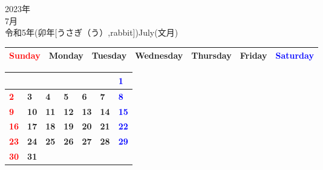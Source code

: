 \documentclass[a4paper,landscape]{jsarticle}
\newcommand{\dig}{\hspace{29mm}}
\newcommand{\tdig}{\hspace{27mm}}
\newcommand{\LBF}{\LARGE\textbf}
\begin{document}
\newpage

\begin{center}
	\HUGE 2023年\\
	\huge 7月\\
	\large 令和5年(卯年[うさぎ（う）,rabbit])July(文月)
\end{center}

\begingroup
\renewcommand{\arraystretch}{1.4}
\begin{tabular}{|>{\centering\arraybackslash}p{32mm}|>{\centering\arraybackslash}p{32mm}|>{\centering\arraybackslash}p{32mm}|>{\centering\arraybackslash}p{32mm}|>{\centering\arraybackslash}p{32mm}|>{\centering\arraybackslash}p{32mm}|>{\centering\arraybackslash}p{32mm}|}
\hline
\textcolor{red}{\large Sunday}&\large Monday&\large Tuesday&\large Wednesday&\large Thursday&\large Friday&\textcolor{blue}{\large Saturday}\\
\hline
\end{tabular}
\endgroup

\begingroup
\renewcommand{\arraystretch}{4}
\begin{tabular}{|p{32mm}|p{32mm}|p{32mm}|p{32mm}|p{32mm}|p{32mm}|p{32mm}|}
\hline
&&&&&&\raisebox{30pt} {\dig\textcolor{blue}{\LBF{1}}}\\
\hline
\raisebox{30pt} {\dig\textcolor{red}{\LBF{2}}}&\raisebox{30pt} {\dig\LBF{3}}&\raisebox{30pt} {\dig\LBF{4}}&\raisebox{30pt} {\dig\LBF{5}}&\raisebox{30pt} {\dig\LBF{6}}&\raisebox{30pt} {\dig\LBF{7}}&\raisebox{30pt} {\dig\textcolor{blue}{\LBF{8}}}\\
\hline
\raisebox{30pt} {\dig\textcolor{red}{\LBF{9}}}&\raisebox{30pt} {\tdig\LBF{10}}&\raisebox{30pt} {\tdig\LBF{11}}&\raisebox{30pt} {\tdig\LBF{12}}&\raisebox{30pt} {\tdig\LBF{13}}&\raisebox{30pt} {\tdig\LBF{14}}&\raisebox{30pt} {\tdig\textcolor{blue}{\LBF{15}}}\\
\hline
\raisebox{30pt} {\tdig\textcolor{red}{\LBF{16}}}&\raisebox{30pt} {\tdig\LBF{17}}&\raisebox{30pt} {\tdig\LBF{18}}&\raisebox{30pt} {\tdig\LBF{19}}&\raisebox{30pt} {\tdig\LBF{20}}&\raisebox{30pt} {\tdig\LBF{21}}&\raisebox{30pt} {\tdig\textcolor{blue}{\LBF{22}}}\\
\hline
\raisebox{30pt} {\tdig\textcolor{red}{\LBF{23}}}&\raisebox{30pt} {\tdig\LBF{24}}&\raisebox{30pt} {\tdig\LBF{25}}&\raisebox{30pt} {\tdig\LBF{26}}&\raisebox{30pt} {\tdig\LBF{27}}&\raisebox{30pt} {\tdig\LBF{28}}&\raisebox{30pt} {\tdig\textcolor{blue}{\LBF{29}}}\\
\hline
\raisebox{30pt} {\tdig\textcolor{red}{\LBF{30}}}&\raisebox{30pt} {\tdig\LBF{31}}&&&&&\\
\hline
\end{tabular}
\endgroup
\end{document}
